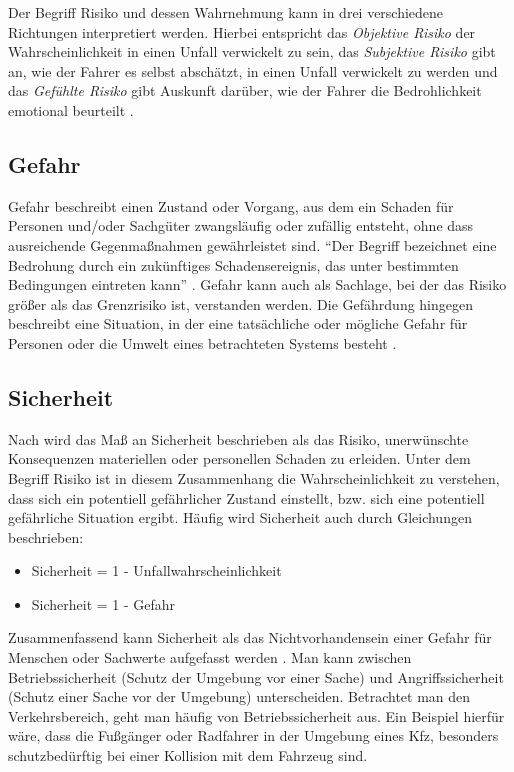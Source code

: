 Der Begriff Risiko und dessen Wahrnehmung kann in drei verschiedene Richtungen interpretiert werden. Hierbei entspricht das \textit{Objektive Risiko} der Wahrscheinlichkeit in einen Unfall verwickelt zu sein, das \textit{Subjektive Risiko} gibt an, wie der Fahrer es selbst abschätzt, in einen Unfall verwickelt zu werden und das \textit{Gefühlte Risiko} gibt Auskunft darüber, wie der Fahrer die Bedrohlichkeit emotional beurteilt \parencite[S. 461f]{Fuller.2005}.

\subsection{Gefahr}
Gefahr beschreibt einen Zustand oder Vorgang, aus dem ein Schaden für Personen und/oder Sachgüter zwangsläufig oder zufällig entsteht, ohne dass ausreichende Gegenmaßnahmen gewährleistet sind. \enquote{Der Begriff bezeichnet eine Bedrohung durch ein zukünftiges Schadensereignis, das unter bestimmten Bedingungen eintreten kann} \parencite[S. 8]{Hoffmann.26.04.2013}. Gefahr kann auch als Sachlage, bei der das Risiko größer als das Grenzrisiko ist, verstanden werden. Die Gefährdung hingegen beschreibt eine Situation, in der eine tatsächliche oder mögliche Gefahr für Personen oder die Umwelt eines betrachteten Systems besteht \parencite[S. 43f]{Hillenbrand.2012}.

\subsection{Sicherheit}
Nach \Textcite[S. 40]{Fricke.2006} wird das Maß an Sicherheit beschrieben als das Risiko, unerwünschte Konsequenzen materiellen oder personellen Schaden zu erleiden. Unter dem Begriff Risiko ist in diesem Zusammenhang die Wahrscheinlichkeit zu verstehen, dass sich ein potentiell gefährlicher Zustand einstellt, bzw. sich eine potentiell gefährliche Situation ergibt. Häufig wird Sicherheit auch durch Gleichungen beschrieben:

\begin{itemize}
	\item Sicherheit = 1 - Unfallwahrscheinlichkeit \parencite[S. 24]{Hoffmann.26.04.2013}
	\item Sicherheit = 1 - Gefahr \parencite[S. 42]{Hillenbrand.2012}
\end{itemize}

Zusammenfassend kann Sicherheit als das Nichtvorhandensein einer Gefahr für Menschen oder Sachwerte aufgefasst werden \parencite[S. 42]{Hillenbrand.2012}. Man kann zwischen Betriebssicherheit (Schutz der Umgebung vor einer Sache) und Angriffssicherheit (Schutz einer Sache vor der Umgebung) unterscheiden. Betrachtet man den Verkehrsbereich, geht man häufig von Betriebssicherheit aus. Ein Beispiel hierfür wäre, dass die Fußgänger oder Radfahrer in der Umgebung eines Kfz, besonders schutzbedürftig bei einer Kollision mit dem Fahrzeug sind. 

